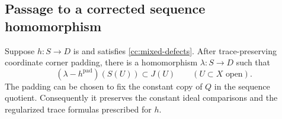 \subsection{Passage to a corrected sequence homomorphism}

\begin{proposition}\label{cc:correction}
Suppose $h:S\to D$ is \cpc and satisfies
\eqref{cc:mixed-defects}.  After trace-preserving coordinate
corner padding, there is a homomorphism $\lambda:S\to D$ such
that
\begin{equation}\label{cc:corrected-difference}
 (\lambda-h^{\mathrm{pad}})(S(U))\subset J(U)
 \qquad(U\subset X\text{ open}).
\end{equation}
The padding can be chosen to fix the constant copy of $Q$ in
the sequence quotient.  Consequently it preserves the constant
ideal comparisons and the regularized trace formulas prescribed
for $h$.
\end{proposition}

